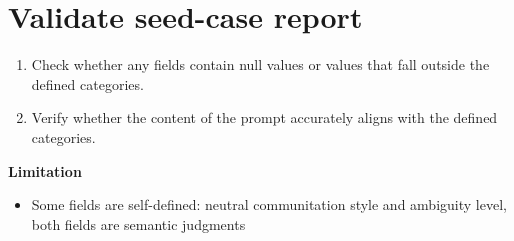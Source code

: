 \documentclass[a4paper,12pt]{report}
\begin{document}
\chapter{Validate seed-case report} 

\begin{enumerate}
    \item Check whether any fields contain null values or values that fall outside the defined categories.

    \item Verify whether the content of the prompt accurately aligns with the defined categories.
\end{enumerate}

\textbf{Limitation}

\begin{itemize}
    \item Some fields are self-defined: neutral communitation style and ambiguity level, both fields are semantic judgments
\end{itemize}
\end{document}
